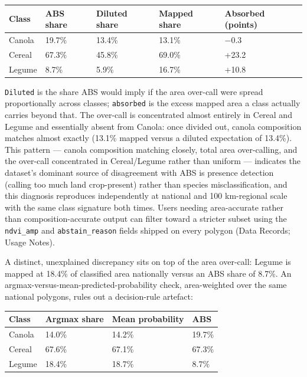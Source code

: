\begin{longtable}[]{@{}lllll@{}}
\toprule\noalign{}
Class & ABS share & Diluted share & Mapped share & Absorbed (points) \\
\midrule\noalign{}
\endhead
\bottomrule\noalign{}
\endlastfoot
Canola & 19.7\% & 13.4\% & 13.1\% & $-$0.3 \\
Cereal & 67.3\% & 45.8\% & 69.0\% & +23.2 \\
Legume & 8.7\% & 5.9\% & 16.7\% & +10.8 \\
\end{longtable}


\texttt{Diluted} is the share ABS would imply if the area over-call were spread proportionally across classes; \texttt{absorbed} is the excess mapped area a class actually carries beyond that. The over-call is concentrated almost entirely in Cereal and Legume and essentially absent from Canola: once divided out, canola composition matches almost exactly (13.1\% mapped versus a diluted expectation of 13.4\%). This pattern --- canola composition matching closely, total area over-calling, and the over-call concentrated in Cereal/Legume rather than uniform --- indicates the dataset's dominant source of disagreement with ABS is presence detection (calling too much land crop-present) rather than species misclassification, and this diagnosis reproduces independently at national and 100 km-regional scale with the same class signature both times. Users needing area-accurate rather than composition-accurate output can filter toward a stricter subset using the \texttt{ndvi\_amp} and \texttt{abstain\_reason} fields shipped on every polygon (Data Records; Usage Notes).

A distinct, unexplained discrepancy sits on top of the area over-call: Legume is mapped at 18.4\% of classified area nationally versus an ABS share of 8.7\%. An argmax-versus-mean-predicted-probability check, area-weighted over the same national polygons, rules out a decision-rule artefact:

\begin{longtable}[]{@{}llll@{}}
\toprule\noalign{}
Class & Argmax share & Mean probability & ABS \\
\midrule\noalign{}
\endhead
\bottomrule\noalign{}
\endlastfoot
Canola & 14.0\% & 14.2\% & 19.7\% \\
Cereal & 67.6\% & 67.1\% & 67.3\% \\
Legume & 18.4\% & 18.7\% & 8.7\% \\
\end{longtable}


